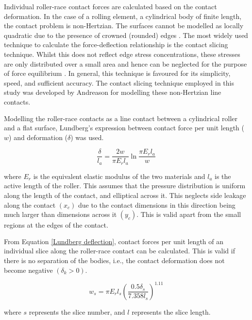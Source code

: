 Individual roller-race contact forces are calculated based on the contact deformation. In the case of a rolling element, a cylindrical body of finite length, the contact problem is non-Hertzian. The surfaces cannot be modelled as locally quadratic due to the presence of crowned (rounded) edges \cite{Singh1974}. The most widely used technique to calculate the force-deflection relationship is the contact slicing technique. Whilst this does not reflect edge stress concentrations, these stresses are only distributed over a small area and hence can be neglected for the purpose of force equilibrium \cite{Harris2007a}. In general, this technique is favoured for its simplicity, speed, and sufficient accuracy. The contact slicing technique employed in this study was developed by Andreason \cite{Andreason1973} for modelling these non-Hertzian line contacts.
 
Modelling the roller-race contacts as a line contact between a cylindrical roller and a flat surface, Lundberg’s \cite{Lundberg1949} expression between contact force per unit length ($w$) and deformation ($\delta$) was used. 

\begin{equation}\label{Lundberg deflection}
	\frac{\delta}{l_a}=\frac{2 w}{\pi E_r l_a} \ln \frac{\pi E_r l_a}{w}
\end{equation}

where $E_r$ is the equivalent elastic modulus of the two materials and $l_a$ is the active length of the roller. This assumes that the pressure distribution is uniform along the length of the contact, and elliptical across it. This neglects side leakage along the contact $\left(x_c\right)$ due to the contact dimensions in this direction being much larger than dimensions across it $\left(y_c\right)$. This is valid apart from the small regions at the edges of the contact.

From Equation \ref{Lundberg deflection}, contact forces per unit length of an individual slice along the roller-race contact can be calculated. This is valid if there is no separation of the bodies, i.e., the contact deformation does not become negative $\left(\delta_k>0\right)$.

\begin{equation}\label{Contact force per unit length Lundberg}
	w_s=\pi E_r l_s\left(\frac{0.5 \delta_s}{7.358 l_s}\right)^{1.11}
\end{equation}

where $s$ represents the slice number, and $l$ represents the slice length.

